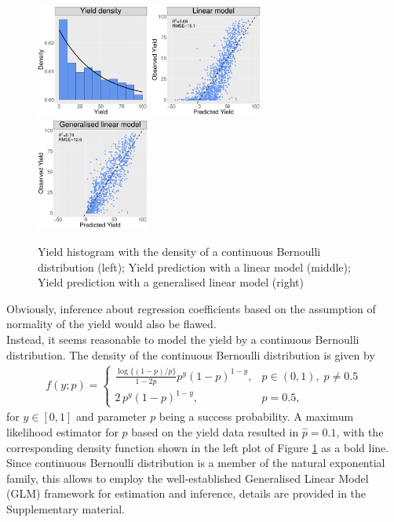 \documentclass[12pt]{article}
\def\beqn{\begin{eqnarray*}}
\def\eeqn{\end{eqnarray*}}
\begin{document}
\begin{figure}[t]
	\includegraphics[width=0.33\textwidth]{Plots/yield_hist.pdf}
	\includegraphics[width=0.33\textwidth]{Plots/linear_model.pdf}\includegraphics[width=0.33\textwidth]{Plots/cb_model.pdf}
	\caption{Yield histogram with the density of a continuous Bernoulli distribution (left); Yield prediction with a linear model (middle); Yield prediction with a generalised linear model (right)}
	\label{Fig1}
\end{figure}
Obviously, inference about regression coefficients based on the assumption of normality of the yield would also be flawed. \\
Instead, it seems reasonable to model the yield by a continuous Bernoulli distribution. The density of the continuous Bernoulli distribution is given by
\beqn
f(y;p)=\begin{cases}
	\frac{\log\{(1-p)/p\}}{1-2p}p^y(1-p)^{1-y},&p\in(0,1), \;p\neq 0.5\\
	2\,p^y(1-p)^{1-y},&p=0.5,
\end{cases}
\eeqn 
for $y\in[0,1]$ and parameter $p$ being a success probability. A maximum likelihood estimator for $p$ based on the yield data resulted in $\hat{p}=0.1$, with the corresponding density function shown in the left plot of Figure \ref{Fig1} as a bold line. Since continuous Bernoulli distribution is a member of the natural exponential family, this allows to employ the well-established Generalised Linear Model (GLM) framework for estimation and inference, details are provided in the Supplementary material. 
\end{document}
